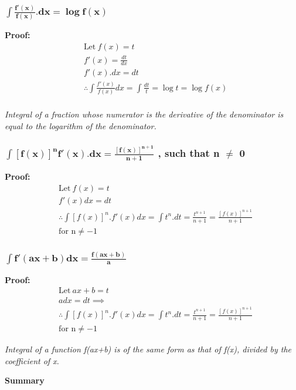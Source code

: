 \subsubsection{$ \mathbf{\int \frac{f'(x)}{f(x)}.dx = \log{f(x)}} $}

\noindent
\textbf{Proof:}
\begin{align*}
&\text{Let} \: f(x) = t \\
&f'(x) = \frac{dt}{dx} \\
&f'(x).dx = dt \\
&\therefore \int \frac{f'(x)}{f(x)}dx = \int \frac{dt}{t} = \log t = \log f(x) \\
\end{align*}

\noindent
\textit{Integral of a fraction whose numerator is the derivative of the denominator is equal to the logarithm of the denominator.}


\subsubsection{$ \mathbf{\int [f(x)]^n f'(x).dx = \frac{[f(x)]^{n+1}}{n+1}}$ , such that n $\neq$ 0}

\noindent
\textbf{Proof:}
\begin{align*}
&\text{Let} \: f(x) = t \\
&f'(x)dx = dt \\
&\therefore \int [f(x)]^n.f'(x)dx = \int t^n.dt = \frac{t^{n+1}}{n+1} = \frac{[f(x)]^{n+1}}{n+1} \\ 
&\text{for n} \neq -1
\end{align*}

\subsubsection{$ \mathbf{\int f'(ax+b)dx = \frac{f(ax+b)}{a}}$}
\noindent
\textbf{Proof:}
\begin{align*}
&\text{Let} \: ax+b = t \\
&adx = dt \implies \\
&\therefore \int [f(x)]^n.f'(x)dx = \int t^n.dt = \frac{t^{n+1}}{n+1} = \frac{[f(x)]^{n+1}}{n+1} \\ 
&\text{for n} \neq -1
\end{align*}

\noindent
\textit{Integral of a function f(ax+b) is of the same form as that of f(x), divided by the coefficient of x.}

\vspace{5mm}
\noindent
\textbf{Summary}


